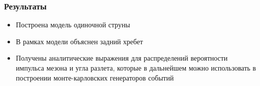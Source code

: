 \documentclass{beamer}
\begin{document}
\begin{frame}[fragile]
\begin{minipage}[h]{0.48\linewidth}
\begin{figure}
\end{figure}
\end{minipage}
\end{frame}

\begin{frame}[fragile]
\frametitle{Результаты}
\begin{itemize}
\item Построена модель одиночной струны
\item В рамках модели объяснен задний хребет
\item Получены аналитические выражения для распределений вероятности импульса мезона и угла разлета, которые в дальнейшем можно использовать в построении монте-карловских генераторов событий
\end{itemize}
\end{frame}
\end{document}
